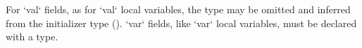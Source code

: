 For \xcd`val` fields, as for \xcd`val` local variables, the type may be
omitted and inferred from the initializer type ().
\xcd`var` fields, like \xcd`var` local variables, must be declared with a type.




